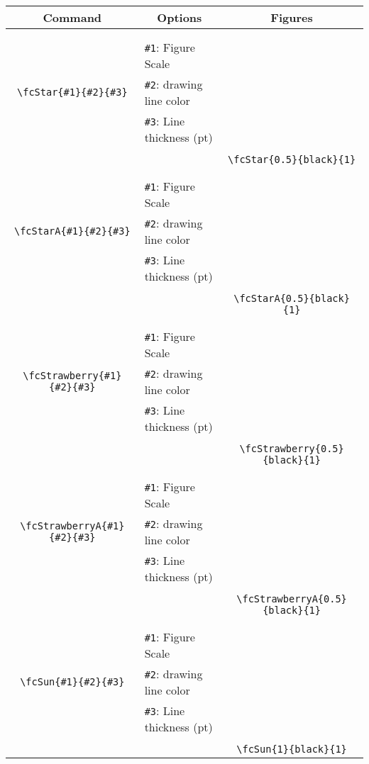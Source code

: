 \documentclass{article}
\begin{document}
\begin{table}[H]\centering\begin{tabular}{|c|l|c|}\hline {\bf Command}& \multicolumn{1}{c|}{{\bf Options}} & {\bf Figures}\\  \hline	&&\multirow{5}{*}{\fcStar{0.5}{black}{1}}\\	&&\\	&\verb|#1|: Figure Scale &\\	\verb|\fcStar{#1}{#2}{#3}|&	\verb|#2|: drawing line color &\\	&\verb|#3|: Line thickness (pt) &\\ &&\\&&	\verb|\fcStar{0.5}{black}{1}|\\\hline 	
	&&\multirow{5}{*}{\fcStarA{0.5}{black}{1}}\\	&&\\	&\verb|#1|: Figure Scale &\\	\verb|\fcStarA{#1}{#2}{#3}|&	\verb|#2|: drawing line color &\\	&\verb|#3|: Line thickness (pt) &\\ &&\\&&	\verb|\fcStarA{0.5}{black}{1}|\\\hline 	
	&&\multirow{5}{*}{\fcStrawberry{0.5}{black}{1}}\\	&&\\	&\verb|#1|: Figure Scale &\\	\verb|\fcStrawberry{#1}{#2}{#3}|&	\verb|#2|: drawing line color &\\	&\verb|#3|: Line thickness (pt) &\\ &&\\&&	\verb|\fcStrawberry{0.5}{black}{1}|\\\hline 	
	&&\multirow{5}{*}{\fcStrawberryA{0.5}{black}{1}}\\	&&\\	&\verb|#1|: Figure Scale &\\	\verb|\fcStrawberryA{#1}{#2}{#3}|&	\verb|#2|: drawing line color &\\	&\verb|#3|: Line thickness (pt) &\\ &&\\&&	\verb|\fcStrawberryA{0.5}{black}{1}|\\\hline 	
	&&\multirow{5}{*}{\fcSun{1}{black}{1}}\\	&&\\	&\verb|#1|: Figure Scale &\\	\verb|\fcSun{#1}{#2}{#3}|&	\verb|#2|: drawing line color &\\	&\verb|#3|: Line thickness (pt) &\\ &&\\&&	\verb|\fcSun{1}{black}{1}|\\\hline 	

\end{tabular}
\end{table}
\end{document}
